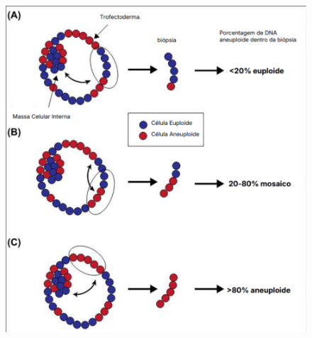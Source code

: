 \begin{figure}[h]
    \captionsetup{font=footnotesize, position=above}
    \label{fig:biopsiaPGT-A}
    \centering
    \includegraphics[scale=0.6]{figuras/biopsiaPGT-A.pdf}
    \vspace{0.3cm} 
    \begin{minipage}{\linewidth}
        \centering

\end{minipage}
\end{figure}
